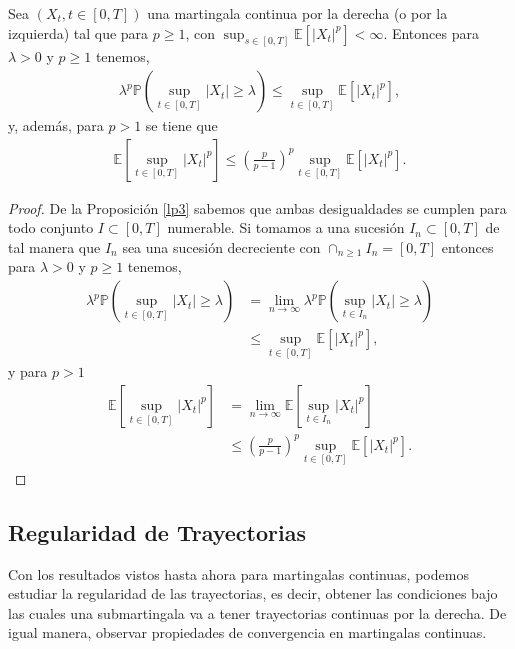 \begin{theorem}
	Sea $(X_t, t\in [0, T])$ una martingala continua por la derecha (o por la izquierda) tal que para $p \geq 1$, con $\sup_{s \in [0, T]} \mathbb{E}[|X_t|^p] < \infty$. Entonces para $\lambda > 0$ y $p \geq 1$ tenemos, 
    \begin{align*}
    \lambda^p \mathbb{P} \left( \sup_{t \in [0, T]} |X_t| \geq \lambda \right)  \leq \sup_{t \in [0, T]} \mathbb{E}[|X_t|^p], 
    \end{align*}
y, además, para $p > 1$ se tiene que
	\begin{align*}
	\mathbb{E} \left[ \sup_{t \in [0, T]} |X_t|^p \right] \leq \left( \frac{p}{p-1} \right)^p \sup_{t \in [0, T]} \mathbb{E}[|X_t|^p].
	\end{align*}
\end{theorem}
\begin{proof}
	De la Proposición \ref{lp3} sabemos que ambas desigualdades se cumplen para todo conjunto $I \subset [0, T]$ numerable. Si tomamos a una sucesión $I_n \subset [0,T]$ de tal manera que $I_n$ sea una sucesión decreciente con $\cap_{n \geq 1} I_n = [0, T]$ entonces para $\lambda > 0$ y $p \geq 1$ tenemos,
    \begin{align*}
		\lambda^p \mathbb{P} \left( \sup_{t \in [0, T]} |X_t| \geq \lambda \right) & = \lim_{n \rightarrow \infty} \lambda^p \mathbb{P} \left( \sup_{t \in I_n} |X_t| \geq \lambda \right) \\ 
        & \leq \sup_{t \in [0, T]} \mathbb{E}[|X_t|^p], 
	\end{align*}
y para $p > 1$
    \begin{align*}
		\mathbb{E} \left[ \sup_{t \in [0, T]} |X_t|^p \right] & = \lim_{n \rightarrow \infty} \mathbb{E} \left[ \sup_{t \in I_n} |X_t|^p \right] \\
        & \leq \left( \frac{p}{p-1} \right)^p \sup_{t \in [0, T]} \mathbb{E}[|X_t|^p].
	\end{align*}
\end{proof}

\subsection{Regularidad de Trayectorias}
Con los resultados vistos hasta ahora para martingalas continuas, podemos estudiar la regularidad de las trayectorias, es decir, obtener las condiciones bajo las cuales una submartingala va a tener trayectorias continuas por la derecha. De igual manera, observar propiedades de convergencia en martingalas continuas. \\

